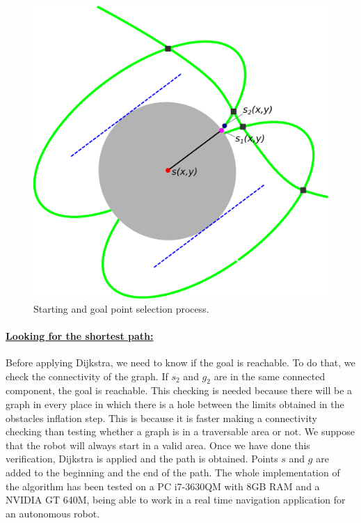 \begin{figure}[h!]
  \centering
  \includegraphics[width=\textwidth, trim=0 0 0 0,clip]{figure6}
  \caption{Starting and goal point selection process.}
  \label{fig:cp06_findstartgoal}
\end{figure}

\paragraph{\underline{Looking for the shortest path:}}\label{ch:chapter06_01_02_04_02}

Before applying Dijkstra, we need to know if the goal is reachable. To do that, we check the connectivity of the graph. If $s_2$ and $g_2$ are in the same connected component, the goal is reachable. This checking is needed because there will be a graph in every place in which there is a hole between the limits obtained in the obstacles inflation step. This is because it is faster making a connectivity checking than testing whether a graph is in a traversable area or not. We suppose that the robot will always start in a valid area.
Once we have done this verification, Dijkstra is applied and the path is obtained. Points $s$ and $g$ are added to the beginning and the end of the path. The whole implementation of the algorithm has been tested on a PC i7-3630QM with 8GB RAM and a NVIDIA GT 640M, being able to work in a real time navigation application for an autonomous robot.

